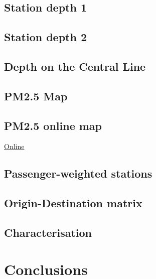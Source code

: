 \documentclass[]{article}
\begin{document}
\hypertarget{station-depth-1}{%
\subsection{Station depth 1}\label{station-depth-1}}

\hypertarget{station-depth-2}{%
\subsection{Station depth 2}\label{station-depth-2}}

\hypertarget{depth-on-the-central-line}{%
\subsection{Depth on the Central Line}\label{depth-on-the-central-line}}

\hypertarget{pm2.5-map}{%
\subsection{PM2.5 Map}\label{pm2.5-map}}

\hypertarget{pm2.5-online-map}{%
\subsection{PM2.5 online map}\label{pm2.5-online-map}}

\href{http://www.erg.kcl.ac.uk/research/home/projects/TubeMapPM25.html}{Online}

\hypertarget{passenger-weighted-stations-1}{%
\subsection{Passenger-weighted
stations}\label{passenger-weighted-stations-1}}

\hypertarget{origin-destination-matrix}{%
\subsection{Origin-Destination matrix}\label{origin-destination-matrix}}

\hypertarget{characterisation}{%
\subsection{Characterisation}\label{characterisation}}

\hypertarget{conclusions}{%
\section{Conclusions}\label{conclusions}}
\end{document}
